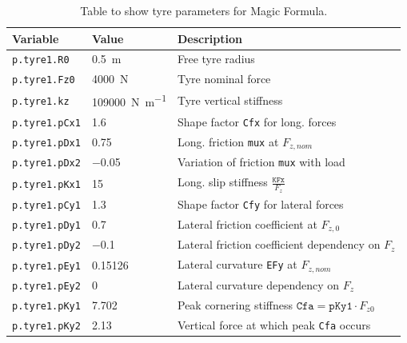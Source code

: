 \documentclass[11pt]{article}
\numberwithin{equation}{section}
\begin{document}
\begin{table}[H]
    \centering
    \begin{tabular}{@{}lll@{}}
        \toprule
        Variable & Value & Description\\
        \midrule
        \texttt{p.tyre1.R0} & \SI{0.5}{\meter} & Free tyre radius\\
        \texttt{p.tyre1.Fz0} & \SI{4000}{\newton} & Tyre nominal force\\
        \texttt{p.tyre1.kz} & \SI{109000}{\newton\per\meter} & Tyre vertical stiffness\\
        \texttt{p.tyre1.pCx1} & \SI{1.6}{} & Shape factor \texttt{Cfx} for long. forces\\
        \texttt{p.tyre1.pDx1} & \SI{0.75}{} & Long. friction \texttt{mux} at $F_{z,nom}$\\
        \texttt{p.tyre1.pDx2} & \SI{-0.05}{} & Variation of friction \texttt{mux} with load\\
        \texttt{p.tyre1.pKx1} & \SI{15}{} & Long. slip stiffness $\frac{\texttt{KFx}}{F_z}$\\
        \texttt{p.tyre1.pCy1} & \SI{1.3}{} & Shape factor \texttt{Cfy} for lateral forces\\
        \texttt{p.tyre1.pDy1} & \SI{0.7}{} & Lateral friction coefficient at $F_{z,0}$\\
        \texttt{p.tyre1.pDy2} & \SI{-0.1}{} & Lateral friction coefficient dependency on $F_z$\\
        \texttt{p.tyre1.pEy1} & \SI{0.15126}{} & Lateral curvature \texttt{EFy} at $F_{z,nom}$\\
        \texttt{p.tyre1.pEy2} & \SI{0}{} & Lateral curvature dependency on $F_z$\\
        \texttt{p.tyre1.pKy1} & \SI{7.702}{} & Peak cornering stiffness $\texttt{Cfa} = \texttt{pKy1}\cdot F_{z0}$\\
        \texttt{p.tyre1.pKy2} & \SI{2.13}{} & Vertical force at which peak \texttt{Cfa} occurs\\
        \bottomrule
    \end{tabular}
    \caption{Table to show tyre parameters for Magic Formula.}
\end{table}
\end{document}
